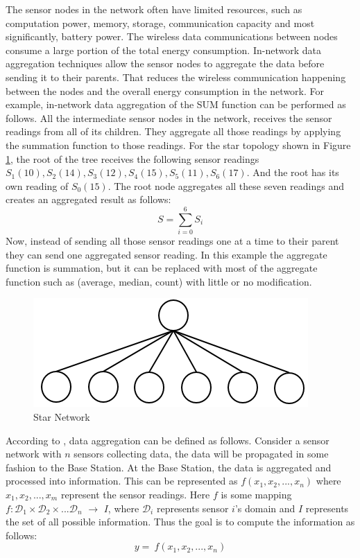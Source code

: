 	The sensor nodes in the network often have limited resources, such as computation power, memory, storage, communication capacity and most significantly, battery power.
	The wireless data communications between nodes consume a large portion of the total energy consumption. 
	In-network data aggregation techniques allow the sensor nodes to aggregate the data before sending it to their parents.
	That reduces the wireless communication happening between the nodes and the overall energy consumption in the network. 	
	For example, in-network data aggregation of the SUM function can be performed as follows.
	All the intermediate sensor nodes in the network, receives the sensor readings from all of its children.
	They aggregate all those readings by applying the summation function to those readings.
	For the star topology shown in Figure \ref{fig:star-network}, the root of the tree receives the following sensor readings $S_{1}(10),S_{2}(14),S_{3}(12),S_{4}(15),S_{5}(11),S_{6}(17)$. And the root has its own reading of $S_{0}(15)$. 
	The root node aggregates all these seven readings and creates an aggregated result as follows:
	\begin{equation}
		S = \sum_{i=0}^6 S_{i}
	\end{equation}
	Now, instead of sending all those sensor readings one at a time to their parent they can send one aggregated sensor reading.
	In this example the aggregate function is summation, but it can be replaced with most of the aggregate function such as (average, median, count) with little or no modification.
	\begin{figure}[h!]
		\centering
		\includegraphics[scale = 1]{images/star-tree.png}
		\caption{Star Network}
		\label{fig:star-network}
	\end{figure}

	According to \cite{zareafifi2012secure}, data aggregation can be defined as follows.
	Consider a sensor network with $n$ sensors collecting data, the data will be propagated in some fashion to the Base Station.
	At the Base Station, the data is aggregated and processed into information. 
	This can be represented as
		$f(x_{1}, x_{2},...,x_{n})$
	where $x_{1}, x_{2},..., x_{m}$ represent the sensor readings.
	Here $f$ is some mapping $f: \mathcal{D}_{1} \times \mathcal{D}_{2} \times ... \mathcal{D}_{n}$ $\rightarrow$ $I$, where $\mathcal{D}_{i}$ represents sensor $i$'s domain and $I$ represents the set of all possible information. 
	Thus the goal is to compute the information as follows:
	\begin{equation}
		\label{eq:aggregation}
		y =\ f(x_{1}, x_{2},...,x_{n})
	\end{equation}

